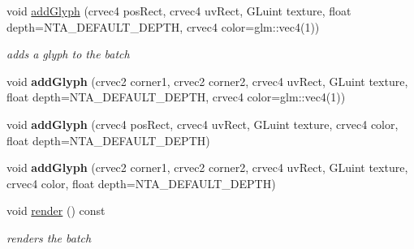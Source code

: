 \begin{DoxyCompactItemize}
\mbox{\label{classnta_1_1SpriteBatch_aa703fb92d0bd42865c21fdfb2625660d}} 
void \hyperlink{classnta_1_1SpriteBatch_aa703fb92d0bd42865c21fdfb2625660d}{add\+Glyph} (crvec4 pos\+Rect, crvec4 uv\+Rect, G\+Luint texture, float depth=N\+T\+A\+\_\+\+D\+E\+F\+A\+U\+L\+T\+\_\+\+D\+E\+P\+TH, crvec4 color=glm\+::vec4(1))
\begin{DoxyCompactList}\small\item\em adds a glyph to the batch \end{DoxyCompactList}\item 
\mbox{\label{classnta_1_1SpriteBatch_a4a6041951ba065a9ad0e7265bef531ef}} 
void {\bfseries add\+Glyph} (crvec2 corner1, crvec2 corner2, crvec4 uv\+Rect, G\+Luint texture, float depth=N\+T\+A\+\_\+\+D\+E\+F\+A\+U\+L\+T\+\_\+\+D\+E\+P\+TH, crvec4 color=glm\+::vec4(1))
\item 
\mbox{\label{classnta_1_1SpriteBatch_a5bfd87da8549218f739977bb3fa3361c}} 
void {\bfseries add\+Glyph} (crvec4 pos\+Rect, crvec4 uv\+Rect, G\+Luint texture, crvec4 color, float depth=N\+T\+A\+\_\+\+D\+E\+F\+A\+U\+L\+T\+\_\+\+D\+E\+P\+TH)
\item 
\mbox{\label{classnta_1_1SpriteBatch_a1acc97aec74cdd4709ea0e2bc064a3ce}} 
void {\bfseries add\+Glyph} (crvec2 corner1, crvec2 corner2, crvec4 uv\+Rect, G\+Luint texture, crvec4 color, float depth=N\+T\+A\+\_\+\+D\+E\+F\+A\+U\+L\+T\+\_\+\+D\+E\+P\+TH)
\item 
\mbox{\label{classnta_1_1SpriteBatch_ae7566d38b0cdd33f2b3e16dfcf993714}} 
void \hyperlink{classnta_1_1SpriteBatch_ae7566d38b0cdd33f2b3e16dfcf993714}{render} () const
\begin{DoxyCompactList}\small\item\em renders the batch \end{DoxyCompactList}\end{DoxyCompactItemize}
